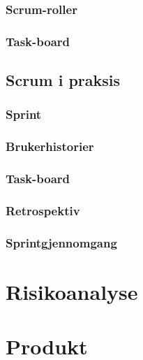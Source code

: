\documentclass[12pt,a4paper,norsk]{article}
\begin{document}
	\subsubsection{Scrum-roller}
	\subsubsection{Task-board}
	\subsection{Scrum i praksis}
	\subsubsection{Sprint}
	\subsubsection{Brukerhistorier}
	\subsubsection{Task-board}
	\subsubsection{Retrospektiv}
	\subsubsection{Sprintgjennomgang}
	\section{Risikoanalyse}
	\section{Produkt}

\newpage
{}


\end{document}
